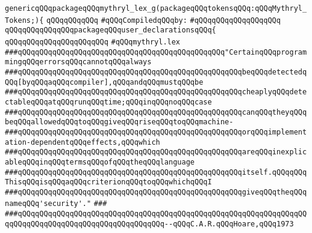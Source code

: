 \label{src/lib/compiler/front/parser/lex/mythryl.lex.pkg}
\verb|genericqQQqpackageqQQqmythryl_lex_g(packageqQQqtokensqQQq:qQQqMythryl_Tokens;){|\newline
\verb|qQQqqQQqqQQq|\newline
\verb|#qQQqCompiledqQQqby:|\newline
\verb|#qQQqqQQqqQQqqQQqqQQq|\newline
\newline
\verb|qQQqqQQqqQQqqQQqpackageqQQquser_declarationsqQQq{|\newline
\verb|qQQqqQQqqQQqqQQqqQQqqQQq|\newline
\verb|#qQQqmythryl.lex|\newline
\newline
\newline
\newline
\verb|###qQQqqQQqqQQqqQQqqQQqqQQqqQQqqQQqqQQqqQQqqQQqqQQq"CertainqQQqprogrammingqQQqerrorsqQQqcannotqQQqalways|\newline
\verb|###qQQqqQQqqQQqqQQqqQQqqQQqqQQqqQQqqQQqqQQqqQQqqQQqqQQqbeqQQqdetectedqQQq[byqQQqaqQQqcompiler],qQQqandqQQqmustqQQqbe|\newline
\verb|###qQQqqQQqqQQqqQQqqQQqqQQqqQQqqQQqqQQqqQQqqQQqqQQqqQQqcheaplyqQQqdetectableqQQqatqQQqrunqQQqtime;qQQqinqQQqnoqQQqcase|\newline
\verb|###qQQqqQQqqQQqqQQqqQQqqQQqqQQqqQQqqQQqqQQqqQQqqQQqqQQqcanqQQqtheyqQQqbeqQQqallowedqQQqtoqQQqgiveqQQqriseqQQqtoqQQqmachine-|\newline
\verb|###qQQqqQQqqQQqqQQqqQQqqQQqqQQqqQQqqQQqqQQqqQQqqQQqqQQqorqQQqimplementation-dependentqQQqeffects,qQQqwhich|\newline
\verb|###qQQqqQQqqQQqqQQqqQQqqQQqqQQqqQQqqQQqqQQqqQQqqQQqqQQqareqQQqinexplicableqQQqinqQQqtermsqQQqofqQQqtheqQQqlanguage|\newline
\verb|###qQQqqQQqqQQqqQQqqQQqqQQqqQQqqQQqqQQqqQQqqQQqqQQqqQQqitself.qQQqqQQqThisqQQqisqQQqaqQQqcriterionqQQqtoqQQqwhichqQQqI|\newline
\verb|###qQQqqQQqqQQqqQQqqQQqqQQqqQQqqQQqqQQqqQQqqQQqqQQqqQQqgiveqQQqtheqQQqnameqQQq'security'."|\newline
\verb|###|\newline
\verb|###qQQqqQQqqQQqqQQqqQQqqQQqqQQqqQQqqQQqqQQqqQQqqQQqqQQqqQQqqQQqqQQqqQQqqQQqqQQqqQQqqQQqqQQqqQQqqQQqqQQqqQQq--qQQqC.A.R.qQQqHoare,qQQq1973|\newline
\newline

